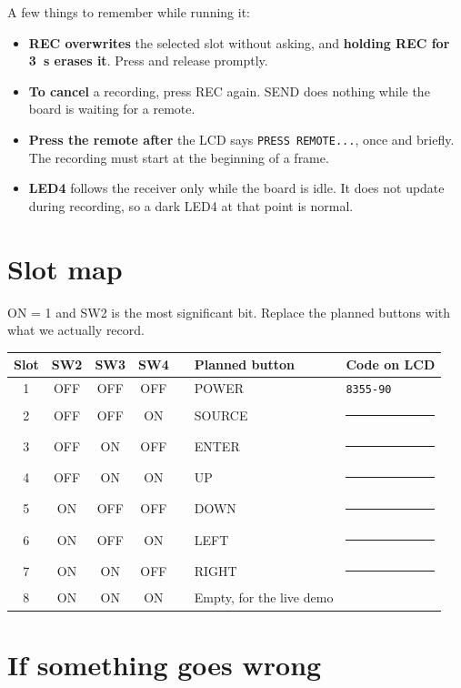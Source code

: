 \documentclass[11pt,a4paper]{article}
\newcommand{\code}[1]{\texttt{#1}}
\begin{document}
A few things to remember while running it:
\begin{itemize}
\item \textbf{REC overwrites} the selected slot without asking, and \textbf{holding REC for \qty{3}{\second} erases it}. Press and release promptly.
\item \textbf{To cancel} a recording, press REC again. SEND does nothing while the board is waiting for a remote.
\item \textbf{Press the remote after} the LCD says \code{PRESS REMOTE...}, once and briefly. The recording must start at the beginning of a frame.
\item \textbf{LED4} follows the receiver only while the board is idle. It does not update during recording, so a dark LED4 at that point is normal.
\end{itemize}

\newpage
\section{Slot map}
\label{sec:slots}

ON = 1 and SW2 is the most significant bit. Replace the planned buttons with what we actually record.

\begin{center}
\small
\begin{tabular}{cccccll}
\toprule
Slot & SW2 & SW3 & SW4 & & Planned button & Code on LCD\\
\midrule
1 & OFF & OFF & OFF & & POWER & \code{8355-90}\\
2 & OFF & OFF & ON & & SOURCE & \rule{1.8cm}{0.3pt}\\
3 & OFF & ON & OFF & & ENTER & \rule{1.8cm}{0.3pt}\\
4 & OFF & ON & ON & & UP & \rule{1.8cm}{0.3pt}\\
5 & ON & OFF & OFF & & DOWN & \rule{1.8cm}{0.3pt}\\
6 & ON & OFF & ON & & LEFT & \rule{1.8cm}{0.3pt}\\
7 & ON & ON & OFF & & RIGHT & \rule{1.8cm}{0.3pt}\\
8 & ON & ON & ON & & Empty, for the live demo & \\
\bottomrule
\end{tabular}
\end{center}

\section{If something goes wrong}
\label{sec:trouble}
\end{document}
